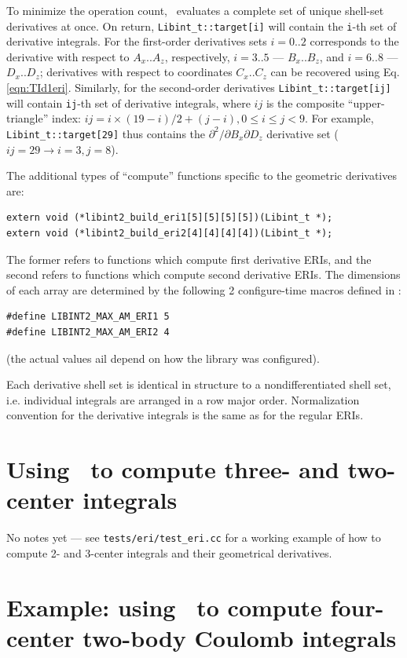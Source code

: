 \documentclass[10pt]{article}
\begin{document}
To minimize the operation count, \LIBINT\ evaluates a complete set of unique shell-set derivatives at once.
On return, {\tt Libint\_t::target[i]} will contain the {\tt i}-th set of derivative integrals. For the first-order derivatives
sets $i=0..2$ corresponds to the derivative with respect to $A_{x} .. A_{z}$, respectively, $i=3..5$ --- $B_{x} .. B_{z}$,
and $i=6..8$ --- $D_{x} .. D_{z}$; derivatives with respect to coordinates $C_{x}..C_{z}$ can be recovered using Eq. \eqref{eqn:TId1eri}.
Similarly, for the second-order derivatives {\tt Libint\_t::target[ij]} will contain {\tt ij}-th set of derivative integrals,
where $ij$ is the composite ``upper-triangle'' index: $ij = i\times(19-i)/2 + (j-i), 0\leq i \leq j<9$.
For example, {\tt Libint\_t::target[29]} thus contains the $\partial^{2}/\partial B_{x} \partial D_{z}$ derivative set ($ij=29 \to i=3, j=8$).

The additional types of ``compute'' functions specific to the geometric derivatives are:
\begin{verbatim}
extern void (*libint2_build_eri1[5][5][5][5])(Libint_t *);
extern void (*libint2_build_eri2[4][4][4][4])(Libint_t *);
\end{verbatim}
The former refers to functions which compute first derivative ERIs, and the second
refers to functions which compute second derivative ERIs.
The dimensions of each array are determined by the following 2 configure-time macros defined in \libintparamsh:
\begin{verbatim}
#define LIBINT2_MAX_AM_ERI1 5
#define LIBINT2_MAX_AM_ERI2 4
\end{verbatim}
(the actual values ail depend on how the library was configured).

Each derivative shell set is identical in structure to a nondifferentiated
shell set, i.e. individual integrals are arranged in a row major order. Normalization convention
for the derivative integrals is the same as for the regular ERIs.

\section{Using \LIBINT\ to compute three- and two-center integrals}

No notes yet --- see {\tt tests/eri/test\_eri.cc} for a working example of how to compute 2- and 3-center integrals and their geometrical derivatives.

\section{Example: using \libint\ to compute four-center two-body Coulomb integrals}
\end{document}
